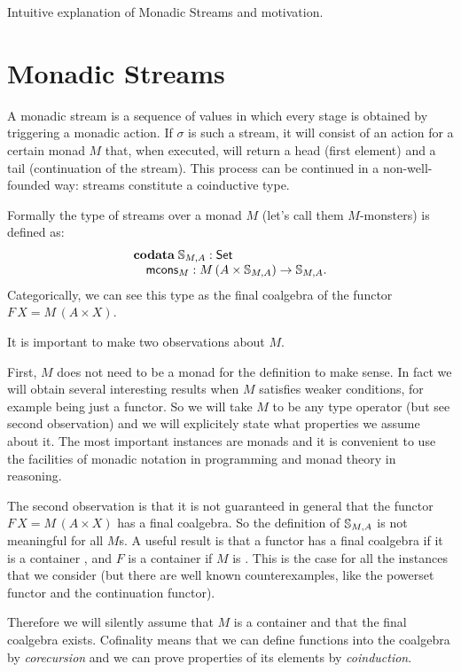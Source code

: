 \documentclass{article}
\begin{document}
Intuitive explanation of Monadic Streams and motivation.

\section{Monadic Streams}

A monadic stream is a sequence of values in which every stage is obtained by triggering a monadic action.
If $\sigma$ is such a stream, it will consist of an action for a certain monad $M$ that, when executed, will return a head (first element) and a tail (continuation of the stream).
This process can be continued in a non-well-founded way: streams constitute a coinductive type.

Formally the type of streams over a monad $M$ (let's call them $M$-monsters) is defined as:
$$
\begin{array}[t]{l}
\mathbf{codata}\;
\mathbb{S}_{M,A}:\mathsf{Set}\\
\quad \mathsf{mcons}_M: M\,(A\times \mathbb{S}_{M,A})\rightarrow\mathbb{S}_{M,A}.
\end{array}
$$
Categorically, we can see this type as the final coalgebra of the functor $F\,X = M\,(A\times X)$.

It is important to make two observations about $M$.

First, $M$ does not need to be a monad for the definition to make sense.
In fact we will obtain several interesting results when $M$ satisfies weaker conditions, for example being just a functor.
So we will take $M$ to be any type operator (but see second observation) and we will explicitely state what properties we assume about it.
The most important instances are monads and it is convenient to use the facilities of monadic notation in programming and monad theory in reasoning.

The second observation is that it is not guaranteed in general that the functor $F\,X = M\,(A\times X)$ has a final coalgebra.
So the definition of $\mathbb{S}_{M,A}$ is not meaningful for all $M$s.
A useful result is that a functor has a final coalgebra if it is a container \cite{AAG:2005}, and $F$ is a container if $M$ is \cite{capretta/fowler:2017}.
This is the case for all the instances that we consider (but there are well known counterexamples, like the powerset functor and the continuation functor).

Therefore we will silently assume that $M$ is a container and that the final coalgebra exists.
Cofinality means that we can define functions into the coalgebra by {\em corecursion} and we can prove properties of its elements by {\em coinduction}.
\end{document}
